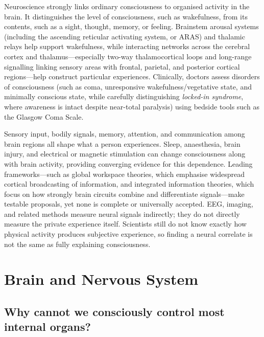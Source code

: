 \documentclass[11pt,oneside]{report}
\begin{document}
Neuroscience strongly links ordinary consciousness to organised activity in the
brain. It distinguishes the level of consciousness, such as wakefulness, from
its contents, such as a sight, thought, memory, or feeling. Brainstem arousal systems (including the ascending reticular activating system,
or ARAS) and thalamic relays help support wakefulness, while interacting
networks across the cerebral cortex and thalamus---especially two-way
thalamocortical loops and long-range signalling linking sensory areas with
frontal, parietal, and posterior cortical regions---help construct particular
experiences. Clinically, doctors assess disorders of consciousness (such as
coma, unresponsive wakefulness/vegetative state, and minimally conscious state,
while carefully distinguishing \emph{locked-in syndrome}, where awareness is
intact despite near-total paralysis) using bedside tools such as the Glasgow
Coma Scale.

Sensory input, bodily signals, memory, attention, and communication among brain
regions all shape what a person experiences. Sleep, anaesthesia, brain injury,
and electrical or magnetic stimulation can change consciousness along with
brain activity, providing converging evidence for this dependence. Leading
frameworks---such as global workspace theories, which emphasise widespread
cortical broadcasting of information, and integrated information theories, which
focus on how strongly brain circuits combine and differentiate signals---make
testable proposals, yet none is complete or universally accepted. EEG, imaging,
and related methods measure neural signals indirectly; they do not directly
measure the private experience itself. Scientists still do not know exactly how
physical activity produces subjective experience, so finding a neural correlate
is not the same as fully explaining consciousness.

\chapter{Brain and Nervous System}

\section{Why cannot we consciously control most internal organs?}
\end{document}
